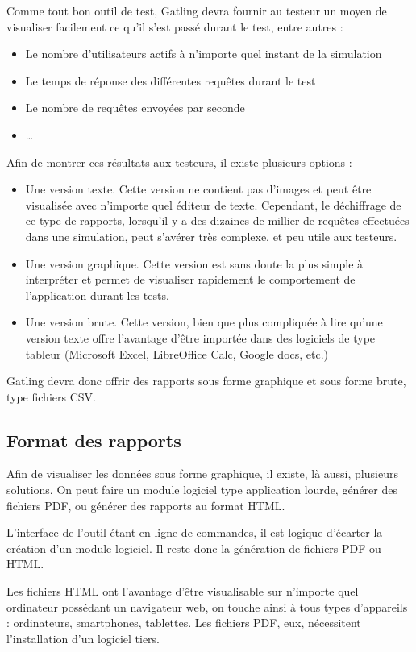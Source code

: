 Comme tout bon outil de test, Gatling devra fournir au testeur un moyen de visualiser facilement ce qu'il s'est passé durant le test, entre autres :
\begin{itemize}
  \item Le nombre d'utilisateurs actifs à n'importe quel instant de la simulation
  \item Le temps de réponse des différentes requêtes durant le test
  \item Le nombre de requêtes envoyées par seconde
  \item \ldots
\end{itemize}

Afin de montrer ces résultats aux testeurs, il existe plusieurs options : 
\begin{itemize}
  \item Une version texte. Cette version ne contient pas d'images et peut être visualisée avec n'importe quel éditeur de texte. Cependant, le déchiffrage de ce type de rapports, lorsqu'il y a des dizaines de millier de requêtes effectuées dans une simulation, peut s'avérer très complexe, et peu utile aux testeurs.
  \item Une version graphique. Cette version est sans doute la plus simple à interpréter et permet de visualiser rapidement le comportement de l'application durant les tests.
  \item Une version brute. Cette version, bien que plus compliquée à lire qu'une version texte offre l'avantage d'être importée dans des logiciels de type tableur (Microsoft Excel, LibreOffice Calc, Google docs, etc.)
\end{itemize}

Gatling devra donc offrir des rapports sous forme graphique et sous forme brute, type fichiers CSV.

\subsection{Format des rapports}

Afin de visualiser les données sous forme graphique, il existe, là aussi, plusieurs solutions. On peut faire un module logiciel type application lourde, générer des fichiers PDF, ou générer des rapports au format HTML. 

L'interface de l'outil étant en ligne de commandes, il est logique d'écarter la création d'un module logiciel. Il reste donc la génération de fichiers PDF ou HTML.

Les fichiers HTML ont l'avantage d'être visualisable sur n'importe quel ordinateur possédant un navigateur web, on touche ainsi à tous types d'appareils : ordinateurs, smartphones, tablettes. Les fichiers PDF, eux, nécessitent l'installation d'un logiciel tiers.

